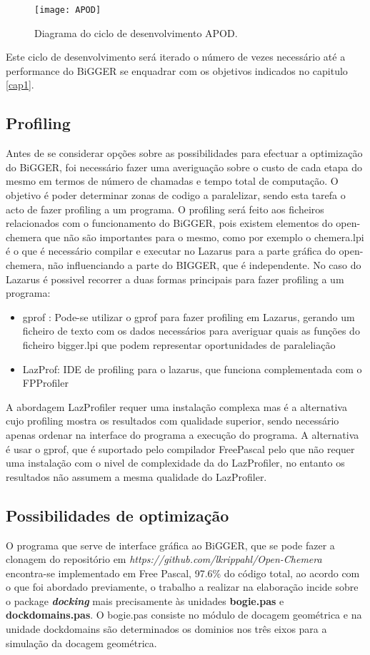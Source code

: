     \begin{figure}[ht]
  \centering
    {\texttt{[image: APOD]}}
  \caption{ Diagrama do ciclo de desenvolvimento APOD\cite{cudaProgGuide}.}
  \label{apodFig}
\end{figure}

Este ciclo de desenvolvimento será iterado o número de vezes necessário até a performance do BiGGER se enquadrar com os objetivos indicados no capitulo \ref{cap1}.
\subsection {Profiling}
\label{profiling}
Antes de se considerar opções sobre as possibilidades para efectuar a optimização do BiGGER, foi necessário fazer uma averiguação sobre o custo de cada etapa do mesmo em termos de número de chamadas e tempo total de computação. O objetivo é poder determinar zonas de codigo a paralelizar, sendo esta tarefa o acto de fazer profiling a um programa. O profiling será feito aos ficheiros relacionados com o funcionamento do BiGGER, pois existem elementos do open-chemera que não são importantes para o mesmo, como por exemplo o chemera.lpi é o que é necessário compilar e executar no Lazarus para a parte gráfica do open-chemera, não influenciando a parte do BIGGER, que é independente.  No caso do Lazarus é possivel recorrer a duas formas principais para fazer profiling a um programa:
\begin{itemize}
\item gprof : Pode-se utilizar o gprof para fazer profiling em Lazarus, gerando um ficheiro de texto com os dados necessários para averiguar quais as funções do ficheiro bigger.lpi que podem representar oportunidades de paraleliação 
\item LazProf: IDE de profiling para o lazarus, que funciona complementada com o FPProfiler 
\end{itemize}  

 A abordagem LazProfiler requer uma instalação complexa mas é a alternativa cujo profiling mostra os resultados com qualidade superior, sendo necessário apenas ordenar na interface do programa a execução do programa. A alternativa é usar o gprof, que é suportado pelo compilador FreePascal pelo que não requer uma instalação com o nivel de complexidade da do LazProfiler, no entanto os resultados não assumem a mesma qualidade do LazProfiler.
\subsection{Possibilidades de optimização} %
\label{abordagem}
O programa que serve de interface gráfica ao BiGGER, que se pode fazer a clonagem do repositório em \textit{https://github.com/lkrippahl/Open-Chemera} encontra-se implementado em Free Pascal, 97.6\% do código total, ao acordo com o que foi abordado previamente, o trabalho a realizar na elaboração incide sobre o package \textbf{\textit{docking}} mais precisamente às unidades \textbf{bogie.pas} e \textbf{dockdomains.pas}. O bogie.pas consiste no módulo de docagem geométrica  e na unidade dockdomains são determinados os dominios nos três eixos para a simulação da docagem geométrica.

